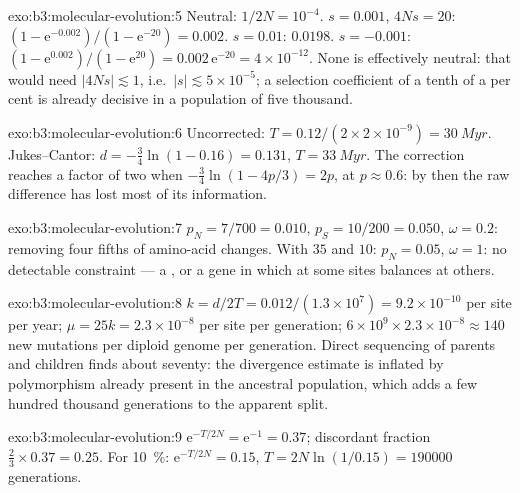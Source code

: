 \begin{solution}{exo:b3:molecular-evolution:5}
Neutral: $1/2N = 10^{-4}$. $s = 0.001$, $4Ns = 20$: $(1 - \mathrm{e}^{-0.002})/
(1 - \mathrm{e}^{-20}) = 0.002$. $s = 0.01$: $0.0198$. $s = -0.001$: $(1 -
\mathrm{e}^{0.002})/(1 - \mathrm{e}^{20}) = 0.002\,\mathrm{e}^{-20} =
4\times 10^{-12}$. None is effectively neutral: that would need $|4Ns|
\lesssim 1$, i.e.\ $|s| \lesssim 5\times 10^{-5}$; a selection
coefficient of a tenth of a per cent is already decisive in a
population of five thousand.
\end{solution}

\begin{solution}{exo:b3:molecular-evolution:6}
Uncorrected: $T = 0.12/(2\times 2\times 10^{-9}) = \qty{30}{Myr}$.
Jukes--Cantor: $d = -\tfrac{3}{4}\ln(1 - 0.16) = 0.131$, $T =
\qty{33}{Myr}$. The correction reaches a factor of two when $-\tfrac{3}{4}
\ln(1 - 4p/3) = 2p$, at $p \approx 0.6$: by then the raw difference has
lost most of its information.
\end{solution}

\begin{solution}{exo:b3:molecular-evolution:7}
$p_{N} = 7/700 = 0.010$, $p_{S} = 10/200 = 0.050$, $\omega = 0.2$:
 removing four fifths of amino-acid changes. With
$35$ and $10$: $p_{N} = 0.05$, $\omega = 1$: no detectable constraint ---
a , or a gene in which  at some sites
balances  at others.
\end{solution}

\begin{solution}{exo:b3:molecular-evolution:8}
$k = d/2T = 0.012/(1.3\times 10^{7}) = 9.2\times 10^{-10}$ per site per
year; $\mu = 25k = 2.3\times 10^{-8}$ per site per generation; $6\times
10^{9}\times 2.3\times 10^{-8} \approx 140$ new mutations per diploid
genome per generation. Direct sequencing of parents and children finds
about seventy: the divergence estimate is inflated by polymorphism
already present in the ancestral population, which adds a few hundred
thousand generations to the apparent split.
\end{solution}

\begin{solution}{exo:b3:molecular-evolution:9}
$\mathrm{e}^{-T/2N} = \mathrm{e}^{-1} = 0.37$; discordant fraction $\tfrac{2}{3}
\times 0.37 = 0.25$. For \qty{10}{\%}: $\mathrm{e}^{-T/2N} = 0.15$, $T =
2N\ln(1/0.15) = \num{190000}$ generations.
\end{solution}

